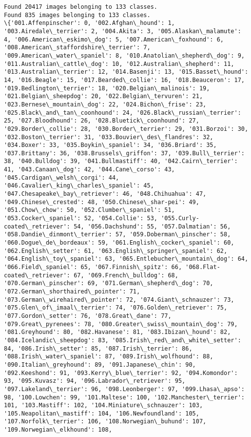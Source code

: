 \documentclass[11pt]{article}
\begin{document}
    \begin{Verbatim}[commandchars=\\\{\}]
Found 20417 images belonging to 133 classes.
Found 835 images belonging to 133 classes.
\{'001.Affenpinscher': 0, '002.Afghan\_hound': 1, '003.Airedale\_terrier': 2, '004.Akita': 3, '005.Alaskan\_malamute': 4, '006.American\_eskimo\_dog': 5, '007.American\_foxhound': 6, '008.American\_staffordshire\_terrier': 7, '009.American\_water\_spaniel': 8, '010.Anatolian\_shepherd\_dog': 9, '011.Australian\_cattle\_dog': 10, '012.Australian\_shepherd': 11, '013.Australian\_terrier': 12, '014.Basenji': 13, '015.Basset\_hound': 14, '016.Beagle': 15, '017.Bearded\_collie': 16, '018.Beauceron': 17, '019.Bedlington\_terrier': 18, '020.Belgian\_malinois': 19, '021.Belgian\_sheepdog': 20, '022.Belgian\_tervuren': 21, '023.Bernese\_mountain\_dog': 22, '024.Bichon\_frise': 23, '025.Black\_and\_tan\_coonhound': 24, '026.Black\_russian\_terrier': 25, '027.Bloodhound': 26, '028.Bluetick\_coonhound': 27, '029.Border\_collie': 28, '030.Border\_terrier': 29, '031.Borzoi': 30, '032.Boston\_terrier': 31, '033.Bouvier\_des\_flandres': 32, '034.Boxer': 33, '035.Boykin\_spaniel': 34, '036.Briard': 35, '037.Brittany': 36, '038.Brussels\_griffon': 37, '039.Bull\_terrier': 38, '040.Bulldog': 39, '041.Bullmastiff': 40, '042.Cairn\_terrier': 41, '043.Canaan\_dog': 42, '044.Cane\_corso': 43, '045.Cardigan\_welsh\_corgi': 44, '046.Cavalier\_king\_charles\_spaniel': 45, '047.Chesapeake\_bay\_retriever': 46, '048.Chihuahua': 47, '049.Chinese\_crested': 48, '050.Chinese\_shar-pei': 49, '051.Chow\_chow': 50, '052.Clumber\_spaniel': 51, '053.Cocker\_spaniel': 52, '054.Collie': 53, '055.Curly-coated\_retriever': 54, '056.Dachshund': 55, '057.Dalmatian': 56, '058.Dandie\_dinmont\_terrier': 57, '059.Doberman\_pinscher': 58, '060.Dogue\_de\_bordeaux': 59, '061.English\_cocker\_spaniel': 60, '062.English\_setter': 61, '063.English\_springer\_spaniel': 62, '064.English\_toy\_spaniel': 63, '065.Entlebucher\_mountain\_dog': 64, '066.Field\_spaniel': 65, '067.Finnish\_spitz': 66, '068.Flat-coated\_retriever': 67, '069.French\_bulldog': 68, '070.German\_pinscher': 69, '071.German\_shepherd\_dog': 70, '072.German\_shorthaired\_pointer': 71, '073.German\_wirehaired\_pointer': 72, '074.Giant\_schnauzer': 73, '075.Glen\_of\_imaal\_terrier': 74, '076.Golden\_retriever': 75, '077.Gordon\_setter': 76, '078.Great\_dane': 77, '079.Great\_pyrenees': 78, '080.Greater\_swiss\_mountain\_dog': 79, '081.Greyhound': 80, '082.Havanese': 81, '083.Ibizan\_hound': 82, '084.Icelandic\_sheepdog': 83, '085.Irish\_red\_and\_white\_setter': 84, '086.Irish\_setter': 85, '087.Irish\_terrier': 86, '088.Irish\_water\_spaniel': 87, '089.Irish\_wolfhound': 88, '090.Italian\_greyhound': 89, '091.Japanese\_chin': 90, '092.Keeshond': 91, '093.Kerry\_blue\_terrier': 92, '094.Komondor': 93, '095.Kuvasz': 94, '096.Labrador\_retriever': 95, '097.Lakeland\_terrier': 96, '098.Leonberger': 97, '099.Lhasa\_apso': 98, '100.Lowchen': 99, '101.Maltese': 100, '102.Manchester\_terrier': 101, '103.Mastiff': 102, '104.Miniature\_schnauzer': 103, '105.Neapolitan\_mastiff': 104, '106.Newfoundland': 105, '107.Norfolk\_terrier': 106, '108.Norwegian\_buhund': 107, '109.Norwegian\_elkhound': 108, 
\end{Verbatim}
\end{document}
